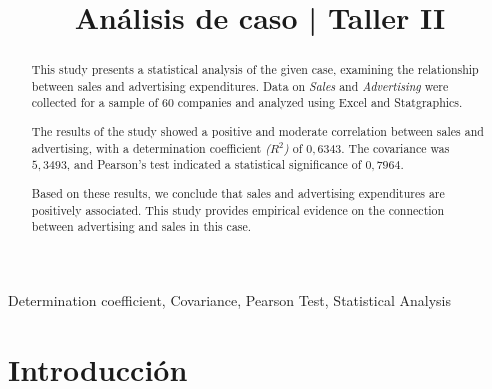 \documentclass[conference]{IEEEtran}
\begin{document}
\title{Análisis de caso | Taller II \\}

\author{

	\and

}

\maketitle



\begin{abstract}
	This study presents a statistical analysis of the given case,
	examining the relationship between sales and advertising expenditures. Data
	on \textit{Sales} and \textit{Advertising} were collected for a sample of 60
	companies and analyzed using Excel and Statgraphics.

	The results of the study showed a positive and moderate correlation
	between sales and advertising, with a determination coefficient \textit{($R^2$)} of
	$0,6343$. The covariance was $5,3493$, and Pearson's test indicated a
	statistical significance of $0,7964$.

	Based on these results, we conclude that sales and advertising expenditures
	are positively associated. This study provides empirical evidence on
	the connection between advertising and sales in this case.
\end{abstract}

\begin{IEEEkeywords}
	Determination coefficient, Covariance, Pearson Test, Statistical Analysis
\end{IEEEkeywords}

\section{Introducción}
\end{document}
